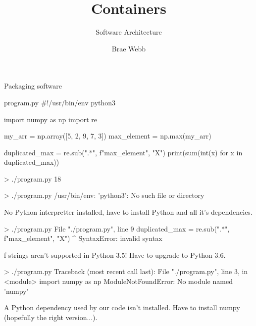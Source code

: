 \documentclass{slide}
\title{Containers}
\subtitle{Software Architecture}
\author{Brae Webb}
\date{\week{3}}
\begin{document}
\maketitle



\begin{frame}[fragile]{Packaging software}
    \vspace{-1em}
    \begin{code}[language=python]{program.py}
#!/usr/bin/env python3

import numpy as np
import re

my_arr = np.array([5, 2, 9, 7, 3])
max_element = np.max(my_arr)

duplicated_max = re.sub(".*", f"{max_element}", "X")
print(sum(int(x) for x in duplicated_max))
    \end{code}
    \begin{code}[numbers=none]{}
> ./program.py
18
    \end{code}
\end{frame}


\begin{frame}[fragile]
    \begin{code}[numbers=none]{}
> ./program.py
/usr/bin/env: 'python3': No such file or directory
    \end{code}
    \pause
    No Python interpretter installed,
    have to install Python and all it's dependencies.
\end{frame}

\begin{frame}[fragile]
    \begin{code}[numbers=none]{}
> ./program.py
File "./program.py", line 9
    duplicated_max = re.sub(".*", f"{max_element}", "X")
                                                 ^
SyntaxError: invalid syntax
    \end{code}
    \pause
    f-strings aren't supported in Python 3.5!
    Have to upgrade to Python 3.6.
\end{frame}

\begin{frame}[fragile]
    \begin{code}[numbers=none]{}
> ./program.py
Traceback (most recent call last):
  File "./program.py", line 3, in <module>
    import numpy as np
ModuleNotFoundError: No module named 'numpy'
    \end{code}
    \pause
    A Python dependency used by our code isn't installed.
    Have to install numpy (hopefully the right version...).
\end{frame}
\end{document}
